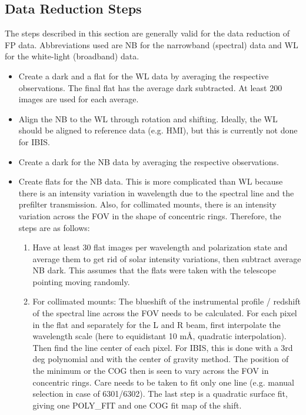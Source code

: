\documentclass[a4paper,11pt]{article}
\begin{document}
\subsection{Data Reduction Steps}
The steps described in this section are generally valid for the data reduction of FP data. Abbreviations used are NB for the narrowband (spectral) data and WL for the white-light (broadband) data.

\begin{itemize}
\item Create a dark and a flat for the WL data by averaging the respective observations. The final flat has  the average dark subtracted. At least 200 images are used for each average.
\item Align the NB to the WL through rotation and shifting. Ideally, the WL should be aligned to reference data (e.g. HMI), but this is currently not done for IBIS.
\item Create a dark for the NB data by averaging the respective observations.
\item Create flats for the NB data. This is more complicated than WL because there is an intensity variation in wavelength due to the spectral line and the prefilter transmission. Also, for collimated mounts, there is an intensity variation across the FOV in the shape of concentric rings. Therefore, the steps are as follows: 
\begin{enumerate}
\item Have at least 30 flat images per wavelength and polarization state and average them to get rid of solar intensity variations, then subtract average NB dark. This assumes that the flats were taken with the telescope pointing moving randomly.
\item For collimated mounts: The blueshift of the instrumental profile / redshift of the spectral line across the FOV needs to be calculated. For each pixel in the flat and separately for the L and R beam, first interpolate the wavelength scale (here to equidistant 10 m\AA, quadratic interpolation). Then find the line center of each pixel. For IBIS, this is done with a 3rd deg polynomial and with the center of gravity method. The position of the minimum or the COG then is seen to vary across the FOV in concentric rings. Care needs to be taken to fit only one line (e.g. manual selection in case of 6301/6302). The last step is a quadratic surface fit, giving one POLY\_FIT and one COG fit map of the shift.

\end{enumerate}
\end{itemize}
\end{document}
